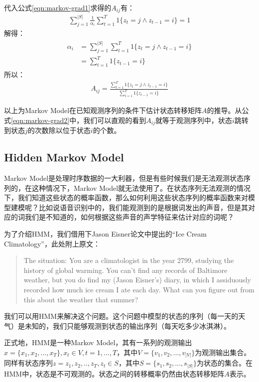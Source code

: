代入公式\ref{eqn:markov-grad1}求得的$A_{ij}$有：
\begin{align}
  \sum_{j=1}^{|S|} \frac{1}{\alpha_i}\sum_{t=1}^{T} 1\{z_t=j \wedge z_{t-1}=i\} = 1
\end{align}
解得：
\begin{align}
\begin{split}
\alpha_i  &= \sum_{j=1}^{|S|} \sum_{t=1}^{T} 1\{z_t=j \wedge z_{t-1}=i\} \\
          &=  \sum_{t=1}^{T} 1\{z_{t-1}=i\}
\end{split}
\end{align}
所以：
\begin{align}
\label{eqn:markov-grad2}
   A_{ij} = \frac{\sum_{t=1}^{T} 1\{z_t=j \wedge z_{t-1}=i\}}{\sum_{t=1}^{T} 1\{z_{t-1}=i\}}
\end{align}

以上为Markov Model在已知观测序列的条件下估计状态转移矩阵$A$的推导。从公式\ref{eqn:markov-grad2}中，我们可以直观的看到$A_{ij}$就等于观测序列中，状态$i$跳转到状态$j$的次数除以位于状态$i$的个数。

\subsection{Hidden Markov Model}
Markov Model是处理时序数据的一大利器，但是有些时候我们是无法观测状态序列的，在这种情况下，Markov Model就无法使用了。在状态序列无法观测的情况下，我们知道这些状态的概率函数，那么如何利用这些状态序列的概率函数来对模型建模呢？比如说语音识别中的，我们能观测到的是根据词发出的声音，但是其对应的词我们是不知道的，如何根据这些声音的声学特征来估计对应的词呢？

为了介绍HMM，我们借用下Jason Eisner论文中提出的“Ice Cream Climatology”，此处附上原文：

\begin{quotation}
The situation: You are a climatologist in the year 2799, studying the history of global warming. You can't find any records of Baltimore weather, but you do find my (Jason Eisner's) diary, in which I assiduously recorded how much ice cream I ate each day. What can you figure out from this about the weather that summer?
\end{quotation}

我们可以用HMM来解决这个问题。这个问题中模型的状态的序列（每一天的天气）是未知的，我们只能够观测到状态的输出序列（每天吃多少冰淇淋）。

正式地，HMM是一种Markov Model，其有一系列的观测输出$x=\{x_1, x_2, ..., x_T\}, x_t\in{V}, t=1,...,T$，其中$V=\{v_1, v_2, ..., v_{|V|}\}$为观测输出集合。同样有状态序列$z={z_1, z_2, .., z_T}, z_{t}\in{S}$，其中$S=\{s_1, s_2, ..., s_{|S|}\}$为状态的集合。在HMM中，状态是不可观测的。状态之间的转移概率仍然由状态转移矩阵$A$表示。

